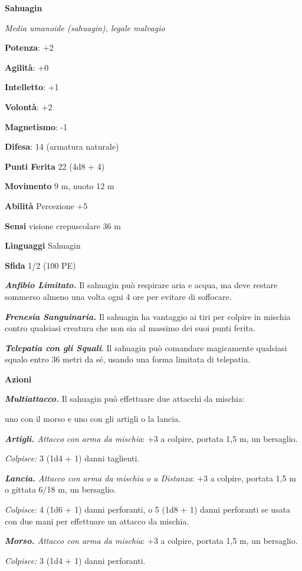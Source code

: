 \begin{multicols}{2}
\textbf{Sahuagin}

\emph{Media umanoide (sahuagin), legale malvagio}

\textbf{Potenza}: +2

\textbf{Agilità}: +0

\textbf{Intelletto}: +1

\textbf{Volontà}: +2

\textbf{Magnetismo}: -1

\textbf{Difesa}: 14 (armatura naturale)

\textbf{Punti Ferita} 22 (4d8 + 4)

\textbf{Movimento} 9 m, nuoto 12 m

\textbf{Abilità} Percezione +5

\textbf{Sensi} visione crepuscolare 36 m

\textbf{Linguaggi} Sahuagin

\textbf{Sfida} 1/2 (100 PE)

\emph{\textbf{Anfibio Limitato.}} Il sahuagin può respirare aria e
acqua, ma deve restare sommerso almeno una volta ogni 4 ore per evitare
di soffocare.

\emph{\textbf{Frenesia Sanguinaria.}} Il sahuagin ha vantaggio ai tiri
per colpire in mischia contro qualsiasi creatura che non sia al massimo
dei suoi punti ferita.

\emph{\textbf{Telepatia con gli Squali}}. Il sahuagin può comandare
magicamente qualsiasi squalo entro 36 metri da sé, usando una forma
limitata di telepatia.

\textbf{Azioni}

\emph{\textbf{Multiattacco.}} Il sahuagin può effettuare due attacchi da
mischia:

uno con il morso e uno con gli artigli o la lancia.

\emph{\textbf{Artigli.} Attacco con arma da mischia}: +3 a colpire,
portata 1,5 m, un bersaglio.

\emph{Colpisce:} 3 (1d4 + 1) danni taglienti.

\emph{\textbf{Lancia.} Attacco con arma da mischia o a Distanza}: +3 a
colpire, portata 1,5 m o gittata 6/18 m, un bersaglio.

\emph{Colpisce:} 4 (1d6 + 1) danni perforanti, o 5 (1d8 + 1) danni
perforanti se usata con due mani per effettuare un attacco da mischia.

\emph{\textbf{Morso.} Attacco con arma da mischia}: +3 a colpire,
portata 1,5 m, un bersaglio.

\emph{Colpisce:} 3 (1d4 + 1) danni perforanti.


\end{multicols}

